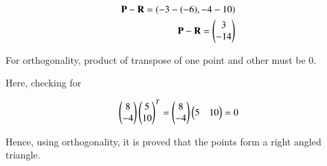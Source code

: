 \documentclass[journal,12pt,twocolumn]{IEEEtran}
\begin{document}
\begin{align}
    \mathbf{P-R} = (-3-(-6), -4-10)
\\
\mathbf{P-R} = \begin{pmatrix}
3\\
-14 
\end{pmatrix}
\end{align}

For orthogonality, product of transpose of one point and other must be 0. 

Here, checking for 


\begin{align}
    \begin{pmatrix}
8\\
-4 
\end{pmatrix}\begin{pmatrix} 5\\
10
\end{pmatrix}^T =  \begin{pmatrix}
8\\
-4 
\end{pmatrix} \begin{pmatrix}
5 & 10
\end{pmatrix}=0
\end{align}

Hence, using orthogonality, it is proved that the points form a right angled triangle. 
\end{document}
